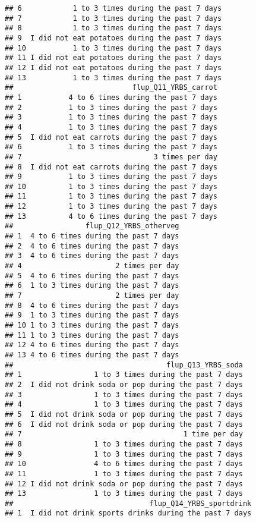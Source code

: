 \documentclass[]{article}
\begin{document}
\begin{verbatim}
## 6            1 to 3 times during the past 7 days
## 7            1 to 3 times during the past 7 days
## 8            1 to 3 times during the past 7 days
## 9  I did not eat potatoes during the past 7 days
## 10           1 to 3 times during the past 7 days
## 11 I did not eat potatoes during the past 7 days
## 12 I did not eat potatoes during the past 7 days
## 13           1 to 3 times during the past 7 days
##                            flup_Q11_YRBS_carrot
## 1           4 to 6 times during the past 7 days
## 2           1 to 3 times during the past 7 days
## 3           1 to 3 times during the past 7 days
## 4           1 to 3 times during the past 7 days
## 5  I did not eat carrots during the past 7 days
## 6           1 to 3 times during the past 7 days
## 7                               3 times per day
## 8  I did not eat carrots during the past 7 days
## 9           1 to 3 times during the past 7 days
## 10          1 to 3 times during the past 7 days
## 11          1 to 3 times during the past 7 days
## 12          1 to 3 times during the past 7 days
## 13          4 to 6 times during the past 7 days
##                 flup_Q12_YRBS_otherveg
## 1  4 to 6 times during the past 7 days
## 2  4 to 6 times during the past 7 days
## 3  4 to 6 times during the past 7 days
## 4                      2 times per day
## 5  4 to 6 times during the past 7 days
## 6  1 to 3 times during the past 7 days
## 7                      2 times per day
## 8  4 to 6 times during the past 7 days
## 9  1 to 3 times during the past 7 days
## 10 1 to 3 times during the past 7 days
## 11 1 to 3 times during the past 7 days
## 12 4 to 6 times during the past 7 days
## 13 4 to 6 times during the past 7 days
##                                    flup_Q13_YRBS_soda
## 1                 1 to 3 times during the past 7 days
## 2  I did not drink soda or pop during the past 7 days
## 3                 1 to 3 times during the past 7 days
## 4                 1 to 3 times during the past 7 days
## 5  I did not drink soda or pop during the past 7 days
## 6  I did not drink soda or pop during the past 7 days
## 7                                      1 time per day
## 8                 1 to 3 times during the past 7 days
## 9                 1 to 3 times during the past 7 days
## 10                4 to 6 times during the past 7 days
## 11                1 to 3 times during the past 7 days
## 12 I did not drink soda or pop during the past 7 days
## 13                1 to 3 times during the past 7 days
##                                flup_Q14_YRBS_sportdrink
## 1  I did not drink sports drinks during the past 7 days

\end{verbatim}
\end{document}
